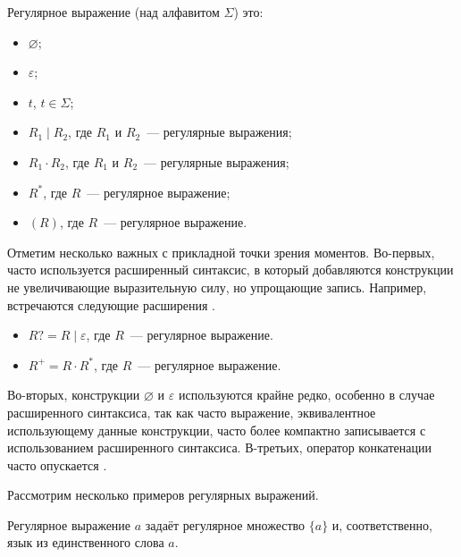 \begin{definition}
    Регулярное выражение (над алфавитом $\Sigma$) это:
    \begin{itemize}
        \item $\varnothing$;
        \item $\varepsilon$;
        \item $t$, $t \in \Sigma$;
        \item $R_1 \mid R_2$, где $R_1$ и $R_2$~--- регулярные выражения;
        \item $R_1 \cdot R_2$, где $R_1$ и $R_2$~--- регулярные выражения;
        \item $R^*$, где $R$~--- регулярное выражение;
        \item $(R)$, где $R$~--- регулярное выражение.
    \end{itemize}
\end{definition}

Отметим несколько важных с прикладной точки зрения моментов.
Во-первых, часто используется расширенный синтаксис, в который добавляются конструкции не увеличивающие выразительную силу, но упрощающие запись.
Например, встречаются следующие расширения%
.
\begin{itemize}
    \item $R? = R \mid \varepsilon$, где $R$~--- регулярное выражение.
    \item $R^+ = R \cdot R^*$, где $R$~--- регулярное выражение.
\end{itemize}

Во-вторых, конструкции $\varnothing$ и $\varepsilon$ используются крайне редко, особенно в случае расширенного синтаксиса, так как часто выражение, эквивалентное использующему данные конструкции, часто более компактно записывается с использованием расширенного синтаксиса.
В-третьих, оператор конкатенации часто опускается%
.

Рассмотрим несколько примеров регулярных выражений.
\begin{example}
    Регулярное выражение $a$ задаёт регулярное множество $\{a\}$ и, соответственно, язык из единственного слова $a$.
\end{example}

